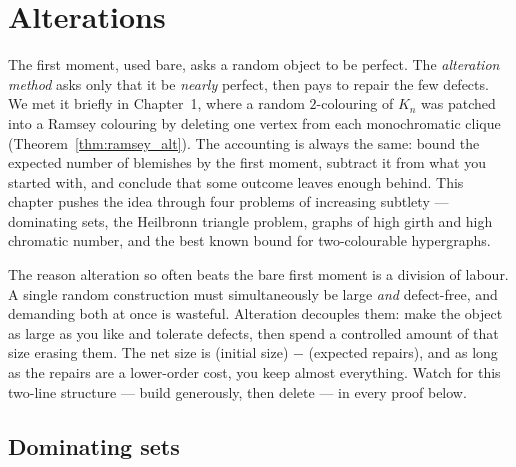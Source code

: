 \providecommand{\E}{\mathbb{E}}
\providecommand{\Prob}{\mathbb{P}}
\providecommand{\ind}{\mathbf{1}}

\chapter{Alterations}
\label{chap:alterations}

The first moment, used bare, asks a random object to be perfect. The
\emph{alteration method} asks only that it be \emph{nearly} perfect, then pays
to repair the few defects. We met it briefly in Chapter~1, where a random
$2$-colouring of $K_n$ was patched into a Ramsey colouring by deleting one
vertex from each monochromatic clique (Theorem~\ref{thm:ramsey_alt}). The
accounting is always the same: bound the expected number of blemishes by the
first moment, subtract it from what you started with, and conclude that some
outcome leaves enough behind. This chapter pushes the idea through four
problems of increasing subtlety --- dominating sets, the Heilbronn triangle
problem, graphs of high girth and high chromatic number, and the best known
bound for two-colourable hypergraphs.

\begin{insight}
The reason alteration so often beats the bare first moment is a division of
labour. A single random construction must simultaneously be large \emph{and}
defect-free, and demanding both at once is wasteful. Alteration decouples them:
make the object as large as you like and tolerate defects, then spend a
controlled amount of that size erasing them. The net size is
(initial size) $-$ (expected repairs), and as long as the repairs are a lower-order
cost, you keep almost everything. Watch for this two-line structure --- build
generously, then delete --- in every proof below.
\end{insight}

\section{Dominating sets}

